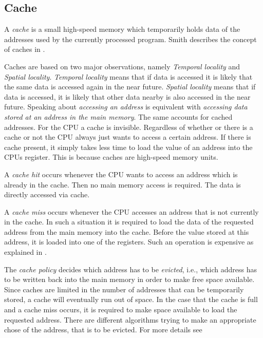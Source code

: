 \documentclass[onecolumn, openright, master, english, signatures]{dbrgrptt}
\begin{document}
\subsection{Cache}
A \emph{cache} is a small high-speed memory which temporarily holds data of the addresses used by the currently processed program.
Smith describes the concept of caches in \cite{smith1982cache}.

Caches are based on two major observations, namely \emph{Temporal locality} and \emph{Spatial locality}.
\emph{Temporal locality} means that if data is accessed it is likely that the same data is accessed again in the near future.
\emph{Spatial locality} means that if data is accessed, it is likely that other data nearby is also accessed in the near future.
Speaking about \emph{accessing an address} is equivalent with \emph{accessing data stored at an address in the main memory}.
The same accounts for cached addresses.
For the \ac{CPU} a cache is invisible.
Regardless of whether or there is a cache or not the \ac{CPU} always just wants to access a certain address.
If there is cache present, it simply takes less time to load the value of an address into the \ac{CPU}s register.
This is because caches are high-speed memory units.

A \emph{cache hit} occurs whenever the \ac{CPU} wants to access an address which is already in the cache.
Then no main memory access is required.
The data is directly accessed via cache.

A \emph{cache miss} occurs whenever the \ac{CPU} accesses an address that is not currently in the cache.
In such a situation it is required to load the data of the requested address from the main memory into the cache.
Before the value stored at this address, it is loaded into one of the registers.
Such an operation is expensive as explained in .

The \emph{cache policy} decides which address has to be \emph{evicted}, i.e., which address has to be written back into the main memory in order to make free space available.
Since caches are limited in the number of addresses that can be temporarily stored, a cache will eventually run out of space.
In the case that the cache is full and a cache miss occurs, it is required to make space available to load the requested address.
There are different algorithms trying to make an appropriate chose of the address, that is to be evicted.
For more details see 

\end{document}
